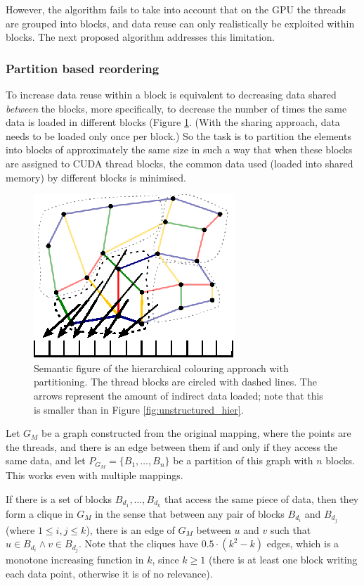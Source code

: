 However, the algorithm fails to take into account that on the GPU the threads
are grouped into blocks, and data reuse can only realistically be exploited
within blocks. The next proposed algorithm addresses this limitation.

\subsubsection{Partition based reordering}

To increase data reuse within a block is equivalent to decreasing data shared
\emph{between} the blocks, more specifically, to decrease the number of times
the same data is loaded in different blocks (Figure \ref{fig:unstructured_part}.
(With the sharing approach, data needs to be loaded only once per block.) So the
task is to partition the elements into blocks of approximately the same size in
such a way that when these blocks are assigned to CUDA thread blocks, the common
data used (loaded into shared memory) by different blocks is minimised.

\begin{figure}[Htpb]
  \centering
  \includegraphics{fig/svg/unstructured_part.eps}
  \caption{Semantic figure of the hierarchical colouring approach with
  partitioning. The thread blocks are circled with dashed lines. The arrows
  represent the amount of indirect data loaded; note that this is smaller than
  in Figure \ref{fig:unstructured_hier}.}
  \label{fig:unstructured_part}
\end{figure}

Let $G_M$ be a graph constructed from the original mapping, where the points are
the threads, and there is an edge between them if and only if they access the
same data, and let $P_{G_M} = \{B_1, \ldots, B_n\}$ be a partition of this graph
with $n$ blocks. This works even with multiple mappings.

If there is a set of blocks $B_{d_1}, \ldots, B_{d_k}$ that access the same
piece of data, then they form a clique in $G_M$ in the sense that between any
pair of blocks $B_{d_i}$ and $B_{d_j}$ (where $1 \le i,j \le k$), there is an
edge of $G_M$ between $u$ and $v$ such that $u \in B_{d_i} \wedge v \in
B_{d_j}$. Note that the cliques have $0.5 \cdot (k^2 - k)$ edges, which is a
monotone increasing function in $k$, since $k \ge 1$ (there is at least one
block writing each data point, otherwise it is of no relevance).

